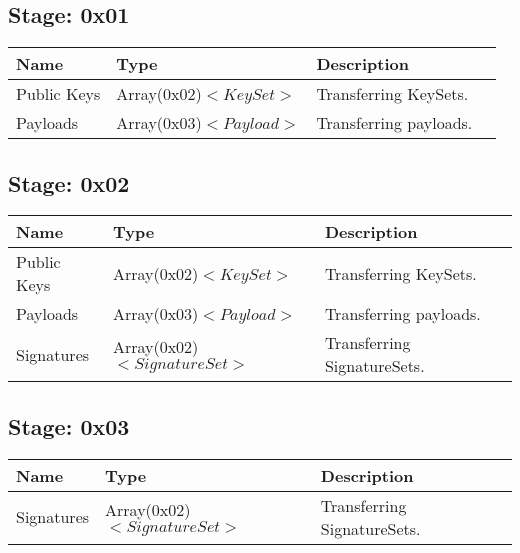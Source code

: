 \documentclass[11pt]{article}
\begin{document}
\subsection{Stage: 0x01}
\begin{center}
\begin{tabular}{ |l|l|l|l| } 
\hline
\textbf{Name} & \textbf{Type} & \textbf{Description}\\
\hline
Public Keys & Array(0x02)$<KeySet>$ & Transferring KeySets. \\  
Payloads & Array(0x03)$<Payload>$  & Transferring payloads.\\  
\hline
\end{tabular}
\end{center}

\subsection{Stage: 0x02}
\begin{center}
\begin{tabular}{ |l|l|l|l| } 
\hline
\textbf{Name} & \textbf{Type} & \textbf{Description}\\
\hline
Public Keys & Array(0x02)$<KeySet>$ & Transferring KeySets. \\  
Payloads & Array(0x03)$<Payload>$  & Transferring payloads.\\  
Signatures & Array(0x02)$<SignatureSet>$ & Transferring SignatureSets.\\  
\hline
\end{tabular}
\end{center}

\subsection{Stage: 0x03}
\begin{center}
\begin{tabular}{ |l|l|l|l| } 
\hline
\textbf{Name} & \textbf{Type} & \textbf{Description}\\
\hline 
Signatures & Array(0x02)$<SignatureSet>$ & Transferring SignatureSets.\\  
\hline
\end{tabular}
\end{center}
\end{document}
